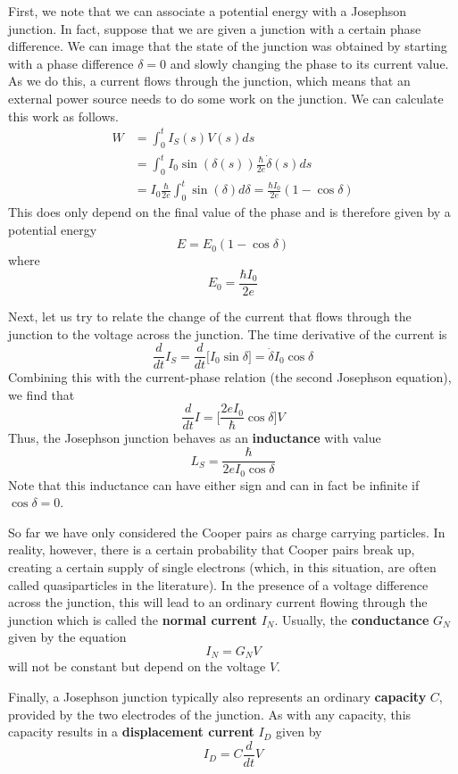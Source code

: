 \documentclass[a4paper, draft]{article}
\theoremstyle{own}
\theoremstyle{remark}
\begin{document}
First, we note that we can associate a potential energy with a Josephson junction. In fact, suppose that we are given a junction with a certain phase difference. We can image that the state of the junction was obtained by starting with a phase difference $\delta=0$ and slowly changing the phase to its current value. As we do this, a current flows through the junction, which means that an external power source needs to do some work on the junction. We can calculate this work as follows.
\begin{align*}
W &= \int_0^t I_S(s) V(s) ds 
\\ &= 
 \int_0^t I_0 \sin(\delta(s)) \frac{\hbar}{2e} \dot{\delta}(s) ds
\\ & =
 I_0\frac{\hbar}{2e} \int_0^t \sin(\delta) d\delta 
 = \frac{\hbar I_0}{2e} (1 - \cos \delta)  
\end{align*}
This does only depend on the final value of the phase and is therefore given by a potential energy
$$
E = E_0 (1 - \cos \delta)
$$
where
$$
E_0 = \frac{\hbar I_0}{2e}
$$

Next, let us try to relate the change of the current that flows through the junction to the voltage across the junction. The time derivative of the current is
$$
\frac{d}{dt} I_S = \frac{d}{dt} \big[ I_0 \sin \delta \big] 
=
\dot{\delta} I_0 \cos \delta
$$
Combining this with the current-phase relation (the second Josephson equation), we find that
$$
\frac{d}{dt} I = \big[ \frac{2eI_0}{\hbar} \cos \delta \big] V
$$
Thus, the Josephson junction behaves as an {\bf inductance} with value
$$
L_S = \frac{\hbar}{2e I_0 \cos \delta}
$$
Note that this inductance can have either sign and can in fact be infinite if $\cos \delta = 0$.

So far we have only considered the Cooper pairs as charge carrying particles. In reality, however, there is a certain probability that Cooper pairs break up, creating a certain supply of single electrons (which, in this situation, are often called quasiparticles in the literature). In the presence of a voltage difference across the junction, this will lead to an ordinary current flowing through the junction which is called the {\bf normal current} $I_N$. Usually, the {\bf conductance} $G_N$ given by the equation
$$
I_N = G_N V
$$
will not be constant but depend on the voltage $V$. 

Finally, a Josephson junction typically also represents an ordinary {\bf capacity} $C$, provided by the two electrodes of the junction. As with any capacity, this capacity results in a {\bf displacement current} $I_D$ given by
$$
I_D = C \frac{d}{dt} V
$$
\end{document}
